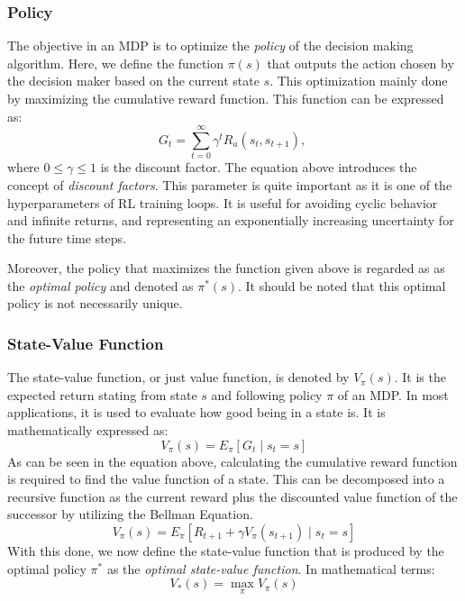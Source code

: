 \subsubsection{Policy}
The objective in an MDP is to optimize the \textit{policy} of the decision making algorithm.
Here, we define the function \(\pi(s)\) that outputs the action chosen by the decision maker
based on the current state \(s\). This optimization mainly done by maximizing the cumulative
reward function. This function can be expressed as:
\begin{equation}
    G_t = \sum^{\infty}_{t=0}{\gamma^t R_a(s_t, s_{t+1})},\;
\end{equation}
where \(0\leq \gamma \leq 1\) is the discount factor. The equation above introduces the concept of \textit{discount factors}. This parameter is quite important as it is one of the hyperparameters of RL training loops. It is useful for avoiding cyclic behavior and infinite returns, and representing an exponentially increasing uncertainty for the future time steps.

Moreover, the policy that maximizes the function given above is regarded as as the
\textit{optimal policy} and denoted as \(\pi^*(s)\). It should be noted that this optimal policy is not necessarily unique.

\subsubsection{State-Value Function}
The state-value function, or just value function, is denoted by \(V_\pi(s)\). It is the expected return stating from state \(s\) and following policy \(\pi \) of an MDP\@. In most applications, it is used to evaluate how good being in a state is. It is mathematically expressed as:
\begin{equation}
    V_\pi(s) = E_\pi[G_t \;|\; s_t = s]
\end{equation}
As can be seen in the equation above, calculating the cumulative reward function is required
to find the value function of a state. This can be decomposed into a recursive function
as the current reward plus the discounted value function of the successor by utilizing
the Bellman Equation.
\begin{equation}
    V_\pi(s) = E_\pi[R_{t+1} + \gamma V_\pi(s_{t+1}) \;|\; s_t = s]
\end{equation}
With this done, we now define the state-value function that is produced by the optimal
policy \(\pi^*\) as the \textit{optimal state-value function}. In mathematical terms:
\begin{equation}
    V_*(s) = \max_\pi{V_\pi(s)}
\end{equation}

